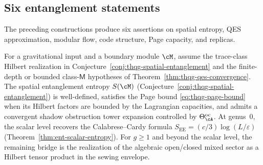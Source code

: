 %
%

\subsection{Six entanglement statements}
\label{subsec:thqg-entanglement-targets}

The preceding constructions produce six assertions on spatial
entropy, QES approximation, modular flow, code structure, Page
capacity, and replicas.

\begin{conjecture}
\ClaimStatusConjectured
\label{conj:thqg-g11-target}
For a gravitational input and a boundary module $\cM$, assume the
trace-class Hilbert realization in
Conjecture~\textup{\ref{conj:thqg-spatial-entanglement}} and the
finite-depth or bounded class-$\mathsf M$ hypotheses of
Theorem~\textup{\ref{thm:thqg-qes-convergence}}.  The spatial
entanglement entropy $S(\cM)$
\textup{(}Conjecture~\textup{\ref{conj:thqg-spatial-entanglement})}
is well-defined, satisfies the Page bound
\eqref{eq:thqg-page-bound} when its Hilbert factors are bounded by
the Lagrangian capacities, and admits a convergent
shadow obstruction tower expansion controlled by
$\Theta^{\mathrm{oc}}_\cA$.
At genus~$0$, the scalar level recovers the Calabrese--Cardy
formula $S_{\mathrm{EE}} = (c/3)\log(L/\varepsilon)$
\textup{(}Theorem~\textup{\ref{thm:ent-scalar-entropy})}.
For $g\ge1$ and beyond the scalar level, the remaining bridge is the
realization of the algebraic open/closed mixed sector as a Hilbert
tensor product in the sewing envelope.
\end{conjecture}

